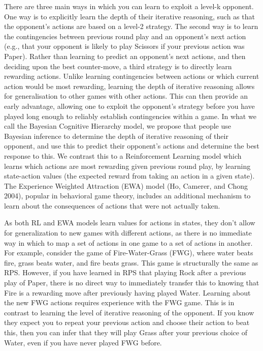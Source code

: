 \documentclass[smallextended]{svjour3}       %
\begin{document}
There are three main ways in which you can learn to exploit a level-k
opponent. One way is to explicitly learn the depth of their iterative
reasoning, such as that the opponent's actions are based on a level-2
strategy. The second way is to learn the contingencies between previous
round play and an opponent's next action (e.g., that your opponent is
likely to play Scissors if your previous action was Paper). Rather than
learning to predict an opponent's next actions, and then deciding upon
the best counter-move, a third strategy is to directly learn rewarding
actions. Unlike learning contingencies between actions or which current
action would be most rewarding, learning the depth of iterative
reasoning allows for generalisation to other games with other actions.
This can then provide an early advantage, allowing one to exploit the
opponent's strategy before you have played long enough to reliably
establish contingencies within a game. In what we call the Bayesian
Cognitive Hierarchy model, we propose that people use Bayesian inference
to determine the depth of iterative reasoning of their opponent, and use
this to predict their opponent's actions and determine the best response
to this. We contrast this to a Reinforcement Learning model which learns
which actions are most rewarding given previous round play, by learning
state-action values (the expected reward from taking an action in a
given state). The Experience Weighted Attraction (EWA) model (Ho,
Camerer, and Chong 2004), popular in behavioral game theory, includes an
additional mechanism to learn about the consequences of actions that
were not actually taken.

As both RL and EWA models learn values for actions in states, they don't
allow for generalization to new games with different actions, as there
is no immediate way in which to map a set of actions in one game to a
set of actions in another. For example, consider the game of
Fire-Water-Grass (FWG), where water beats fire, grass beats water, and
fire beats grass. This game is structurally the same as RPS. However, if
you have learned in RPS that playing Rock after a previous play of
Paper, there is no direct way to immediately transfer this to knowing
that Fire is a rewarding move after previously having played Water.
Learning about the new FWG actions requires experience with the FWG
game. This is in contrast to learning the level of iterative reasoning
of the opponent. If you know they expect you to repeat your previous
action and choose their action to beat this, then you can infer that
they will play Grass after your previous choice of Water, even if you
have never played FWG before.
\end{document}
